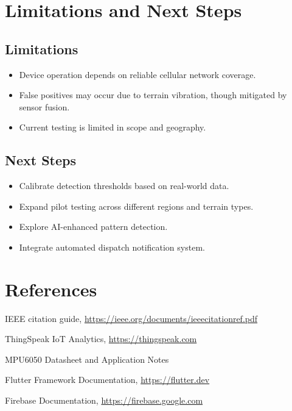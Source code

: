 \documentclass[12pt]{article}
\begin{document}
\section{Limitations and Next Steps}

\subsection{Limitations}
\begin{itemize}
  \item Device operation depends on reliable cellular network coverage.
  \item False positives may occur due to terrain vibration, though mitigated by sensor fusion.
  \item Current testing is limited in scope and geography.
\end{itemize}

\subsection{Next Steps}
\begin{itemize}
  \item Calibrate detection thresholds based on real-world data.
  \item Expand pilot testing across different regions and terrain types.
  \item Explore AI-enhanced pattern detection.
  \item Integrate automated dispatch notification system.
\end{itemize}

\section*{References}
\begin{thebibliography}{9}

 IEEE citation guide, \url{https://ieee.org/documents/ieeecitationref.pdf}

 ThingSpeak IoT Analytics, \url{https://thingspeak.com}

 MPU6050 Datasheet and Application Notes

 Flutter Framework Documentation, \url{https://flutter.dev}

 Firebase Documentation, \url{https://firebase.google.com}

\end{thebibliography}
\end{document}
